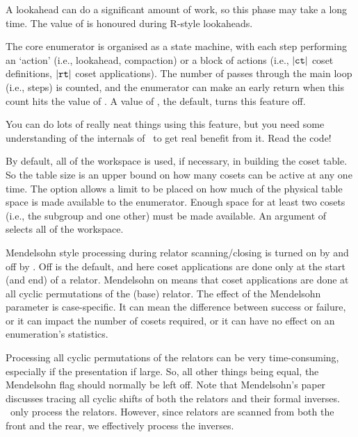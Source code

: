 A lookahead can do a significant amount of work, so this phase may take a
  long time.
The value of  is honoured during R-style lookaheads.

\quad{}

The core enumerator is organised as a state machine, with each step
  performing an `action' (i.e., lookahead, compaction) or a block of
  actions (i.e., $|\texttt{ct}|$ coset definitions, $|\texttt{rt}|$ coset
  applications).
The number of passes through the main loop (i.e., steps) is counted, and
  the enumerator can make an early return when this count hits the
  value of .
A value of , the default, turns this feature off.

You can do lots of really neat things using this feature, but you need
  some understanding of the internals of \ace\ to get real benefit from
  it.
Read the code!

\quad{}

By default, all of the workspace is used, if necessary, in building the
  coset table.
So the table size is an upper bound on how many cosets can be active at
  any one time.
The  option allows a limit to be placed on how much of the
  physical table space is made available to the enumerator.
Enough space for at least two cosets (i.e., the subgroup and one other)
  must be made available.
An argument of  selects all of the workspace.

\quad{}

Mendelsohn style processing during relator scanning/closing is turned on by
   and off by .
Off is the default, and here coset applications are done only at the start
  (and end) of a relator.
Mendelsohn on means that coset applications are done at all cyclic
  permutations of the (base) relator.
The effect of the Mendelsohn parameter is case-specific.
It can mean the difference between success or failure, or it can impact
  the number of cosets required, or it can have no effect on an
  enumeration's statistics.

Processing all cyclic permutations of the relators can be very
  time-consuming, especially if the presentation if large.
So, all other things being equal, the Mendelsohn flag should normally be
  left off.
Note that Mendelsohn's paper \cite{Men} discusses tracing all cyclic 
  shifts of both the relators and their formal inverses.
\ace\ only process the relators.
However, since relators are scanned from both the front and the rear, we
  effectively process the inverses.

